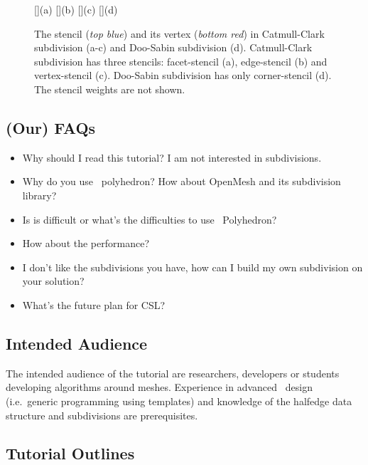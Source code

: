 \documentclass[twocolumn]{article}
\begin{document}
\begin{figure}[tb]
  \centering
  []{(a)}
  []{(b)}
  []{(c)}
  []{(d)}
  \caption{The stencil ({\itshape top blue}) and its 
           vertex ({\itshape bottom red}) in 
           Catmull-Clark subdivision (a-c)
           and Doo-Sabin subdivision (d). Catmull-Clark
           subdivision has three stencils: facet-stencil (a), 
           edge-stencil (b) and vertex-stencil (c). 
           Doo-Sabin subdivision has only corner-stencil (d).
           The stencil weights are not shown.}
  \label{fig:RefMap}
\end{figure}

\subsection*{(Our) FAQs}

\begin{itemize}
\item Why should I read this tutorial? I am not interested in subdivisions. 
\item Why do you use \cgal\  polyhedron? How about OpenMesh and its 
subdivision library?
\item Is is difficult or what's the difficulties to use \cgal\  Polyhedron?
\item How about the performance?
\item I don't like the subdivisions you have, how can I build my own 
subdivision on your solution?
\item What's the future plan for CSL? 
\end{itemize}

\subsection*{Intended Audience}

The intended audience of the tutorial are researchers, developers or
students developing algorithms around meshes. Experience in advanced
\CC\ design (i.e.\ generic programming using templates) and knowledge
of the halfedge data structure and subdivisions are prerequisites.


\subsection*{Tutorial Outlines}
\end{document}
